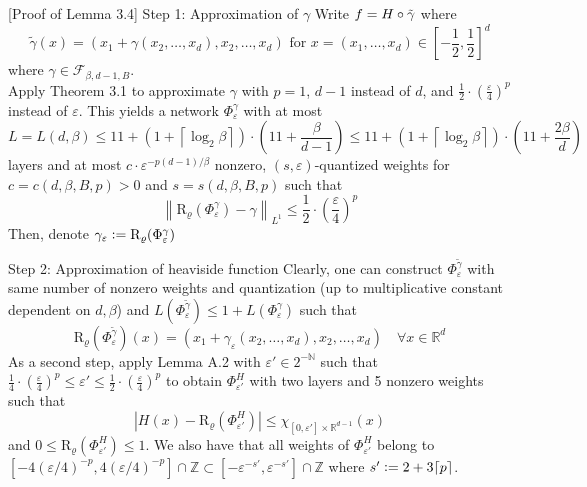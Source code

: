 \documentclass{if-beamer}
\newcommand{\defeq}{\vcentcolon=}
\newcommand{\norm}[2]{\left\lVert#1\right\rVert_{#2}}
\begin{document}
\begin{frame}{[Proof of Lemma 3.4] Step 1: Approximation of $\gamma$}
    Write $f=H \circ \Tilde{\gamma}$ where 
    {\small
    $$\widetilde{\gamma}(x)=\left(x_{1}+\gamma\left(x_{2}, \ldots, x_{d}\right), x_{2}, \ldots, x_{d}\right) \text { for } x=\left(x_{1}, \ldots, x_{d}\right) \in\left[-\frac{1}{2},\frac{1}{2}\right]^{d} $$
    }%
    where $\gamma \in \mathcal{F}_{\beta, d-1,   B}$.  \\
    Apply Theorem 3.1 to approximate $\gamma$ with $p=1$, $d-1$ instead of $d$, and $\frac{1}{2}\cdot \left(\frac{\varepsilon}{4}\right)^p$ instead of $\varepsilon$. This yields a network $\Phi_{\varepsilon}^{\gamma}$ with at most 
    {\small $$L=L(d,\beta) \leq 11+ \left(1+\left\lceil\log _{2} \beta\right\rceil\right) \cdot(11+\frac{\beta}{d-1}) \leq 11+\left(1+\left\lceil\log _{2} \beta\right\rceil\right) \cdot(11+\frac{2\beta}{d})$$ }
    layers and at most $c \cdot \varepsilon^{-p(d-1)/\beta}$ nonzero, $(s, \varepsilon)$-quantized weights for $c = c(d,\beta,B,p) >0$ and $s=s(d, \beta, B, p)$ such that
    $$ \norm{\mathrm{R}_{\varrho}(\Phi_{\varepsilon}^{\gamma}) - \gamma}{L^1} \leq \frac{1}{2}\cdot \left(\frac{\varepsilon}{4} \right)^p
    $$
    Then, denote $\gamma_{\varepsilon} \defeq \mathrm{R}_{\varrho}(\Phi_{\varepsilon}^{\gamma})$
\end{frame}

\begin{frame}{Step 2: Approximation of heaviside function}
    Clearly, one can construct $\Phi_{\varepsilon}^{\widetilde{\gamma}}$ with same number of nonzero weights and quantization (up to multiplicative constant dependent on $d, \beta$) and $L(\Phi_{\varepsilon}^{\widetilde{\gamma}}) \leq 1 + L(\Phi_{\varepsilon}^{\gamma})$ such that
    $$ \mathrm{R}_{\varrho}\left(\Phi_{\varepsilon}^{\widetilde{\gamma}} \right)(x) = \left(x_1 + \gamma_{\varepsilon}(x_2,\dots,x_d),x_2,\dots,x_d \right) \quad \forall x \in \mathbb{R}^d $$
    As a second step, apply Lemma A.2 with $\varepsilon' \in 2^{-\mathbb{N}}$ such that $\frac{1}{4}\cdot \left(\frac{\varepsilon}{4} \right)^p \leq \varepsilon' \leq \frac{1}{2}\cdot \left(\frac{\varepsilon}{4} \right)^p$ to obtain $\Phi_{\varepsilon'}^H$ with two layers and 5 nonzero weights such that $$\left|H(x) - \mathrm{R}_{\varrho}\left(\Phi_{\varepsilon'}^H \right)\right| \leq \chi_{[0, \varepsilon'] \times \mathbb{R}^{d-1}}(x) $$ 
    and $0 \leq\mathrm{R}_{\varrho}\left(\Phi_{\varepsilon'}^H \right) \leq 1$. We also have that all weights of $\Phi_{\varepsilon'}^H$ belong to $[-4(\varepsilon/4)^{-p}, 4(\varepsilon/4)^{-p}] \cap \mathbb{Z} \subset [-\varepsilon^{-s'}, \varepsilon^{-s'}] \cap \mathbb{Z}$ where $s' \defeq 2+3\lceil p \rceil$.
\end{frame}
\end{document}
